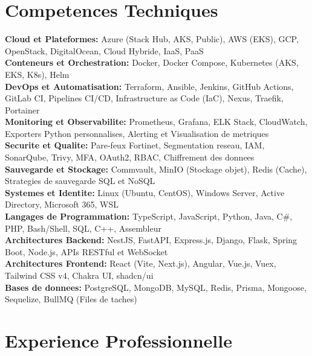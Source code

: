 \documentclass[10pt, letterpaper]{article}
\begin{document}
\section{Competences Techniques}
\textbf{Cloud et Plateformes:} Azure (Stack Hub, AKS, Public), AWS (EKS), GCP, OpenStack, DigitalOcean, Cloud Hybride, IaaS, PaaS \\
\textbf{Conteneurs et Orchestration:} Docker, Docker Compose, Kubernetes (AKS, EKS, K8s), Helm \\
\textbf{DevOps et Automatisation:} Terraform, Ansible, Jenkins, GitHub Actions, GitLab CI, Pipelines CI/CD, Infrastructure as Code (IaC), Nexus, Traefik, Portainer \\
\textbf{Monitoring et Observabilite:} Prometheus, Grafana, ELK Stack, CloudWatch, Exporters Python personnalises, Alerting et Visualisation de metriques \\
\textbf{Securite et Qualite:} Pare-feux Fortinet, Segmentation reseau, IAM, SonarQube, Trivy, MFA, OAuth2, RBAC, Chiffrement des donnees \\
\textbf{Sauvegarde et Stockage:} Commvault, MinIO (Stockage objet), Redis (Cache), Strategies de sauvegarde SQL et NoSQL \\
\textbf{Systemes et Identite:} Linux (Ubuntu, CentOS), Windows Server, Active Directory, Microsoft 365, WSL \\
\textbf{Langages de Programmation:} TypeScript, JavaScript, Python, Java, C\#, PHP, Bash/Shell, SQL, C++, Assembleur \\
\textbf{Architectures Backend:} NestJS, FastAPI, Express.js, Django, Flask, Spring Boot, Node.js, APIs RESTful et WebSocket \\
\textbf{Architectures Frontend:} React (Vite, Next.js), Angular, Vue.js, Vuex, Tailwind CSS v4, Chakra UI, shadcn/ui \\
\textbf{Bases de donnees:} PostgreSQL, MongoDB, MySQL, Redis, Prisma, Mongoose, Sequelize, BullMQ (Files de taches)

\section{Experience Professionnelle}
\end{document}
